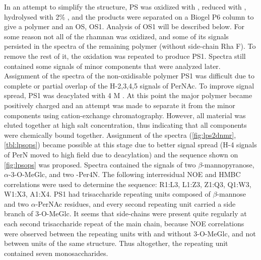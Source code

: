 In an attempt to simplify the structure, \ac{PS} was oxidized with , reduced with
, hydrolysed with 2\% , and the products were separated on a Biogel P6 column
to give a polymer and an \ac{OS}, \ac{OS}1. Analysis of \ac{OS}1 will be described below. For
some reason not all of the rhamnan was oxidized, and some of its signals persisted in the
spectra of the remaining polymer (without side-chain Rha F). To remove the rest of it, the
oxidation was repeated to produce \ac{PS}1. Spectra still contained some signals of minor
components that were analyzed later. Assignment of the spectra of the non-oxidisable polymer \ac{PS}1 was
difficult due to complete or partial overlap of the H-2,3,4,5 signals of PerNAc. To improve
signal spread, \ac{PS}1 was deacylated with 4 M . At this point the major polymer
became positively charged and an attempt was made to separate it from the minor components using
cation-exchange chromatography. However, all material was eluted together at high salt
concentration, thus indicating that all components were chemically bound together. Assignment of
the spectra (\cref{fig:lps2dnmr}, \cref{tbl:lpsops}) became possible at this stage due to better
signal spread (H-4 signals of PerN moved to high field due to deacylation) and the sequence
shown on \cref{fig:lpsops} was proposed. Spectra contained the signals of two
$\beta$-mannopyranose, $\alpha$-3-O-MeGlc, and two -Per4N. The following interresidual \ac{NOE}
and \ac{HMBC} correlations were used to determine the sequence: R1:L3, L1:Z3, Z1:Q3, Q1:W3,
W1:X3, A1:X4. \Ac{PS}1 had trisaccharide repeating units composed of $\beta$-mannose and two
$\alpha$-PerNAc residues, and every second repeating unit carried a side branch of 3-O-MeGlc. It
seems that side-chains were present quite regularly at each second trisaccharide repeat of the
main chain, because \ac{NOE} correlations were observed between the repeating units with and
without 3-O-MeGlc, and not between units of the same structure. Thus altogether, the repeating
unit contained seven monosaccharides.

